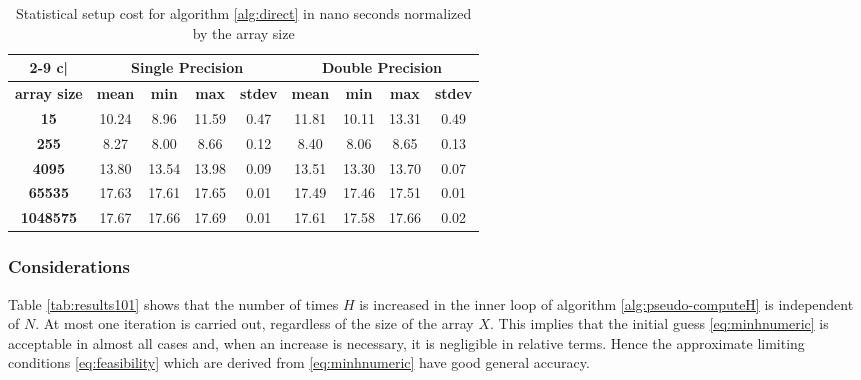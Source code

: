 \documentclass[preprint,1p,times]{elsarticle}
\begin{document}
\begin{table}[ht]
	\centering
	\footnotesize
	\begin{tabular}{| c | c c c c | c c c c |}
		\cline{2-9}
		\multicolumn{1} {c|}{}  & \multicolumn{4}{c|}{\textbf{Single Precision}}  & \multicolumn{4}{c|}{\textbf{Double Precision}} \\
		\hline
		\textbf{array size} & \textbf{mean} & \textbf{min} & \textbf{max} & \textbf{stdev} & \textbf{mean} & \textbf{min} & \textbf{max} & \textbf{stdev} \\
		\hline
		\multicolumn{1}{|c|}{\textbf{15}                                    } &      10.24 &       8.96 &      11.59 &       0.47 &      11.81 &      10.11 &      13.31 &       0.49 \\
		\multicolumn{1}{|c|}{\textbf{255}                                   } &       8.27 &       8.00 &       8.66 &       0.12 &       8.40 &       8.06 &       8.65 &       0.13 \\
		\multicolumn{1}{|c|}{\textbf{4095}                                  } &      13.80 &      13.54 &      13.98 &       0.09 &      13.51 &      13.30 &      13.70 &       0.07 \\
		\multicolumn{1}{|c|}{\textbf{65535}                                 } &      17.63 &      17.61 &      17.65 &       0.01 &      17.49 &      17.46 &      17.51 &       0.01 \\
		\multicolumn{1}{|c|}{\textbf{1048575}                               } &      17.67 &      17.66 &      17.69 &       0.01 &      17.61 &      17.58 &      17.66 &       0.02 \\
		\hline
	\end{tabular}
	\caption{Statistical setup cost for algorithm \ref{alg:direct} in nano seconds normalized by the array size}
	\label{tab:results100}
\end{table}

\subsubsection{Considerations}
Table \ref{tab:results101} shows that the number of times $H$ is increased in the inner loop of algorithm \ref{alg:pseudo-computeH} is independent of $N$. At most one iteration is carried out, regardless of the size of the array $X$. This implies that the initial guess \eqref{eq:minhnumeric} is acceptable in almost all cases and, when an increase is necessary, it is negligible in relative terms. Hence the approximate limiting conditions \eqref{eq:feasibility} which are derived from \eqref{eq:minhnumeric} have good general accuracy.
\end{document}
